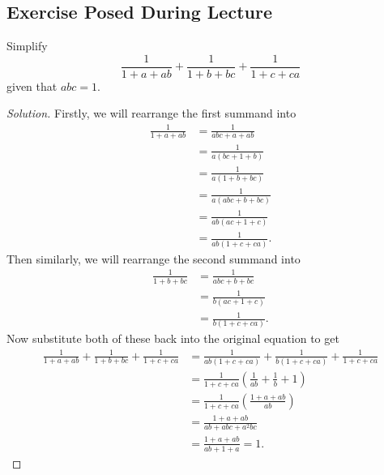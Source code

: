 \documentclass[11pt]{article}
\begin{document}
\subsection{Exercise Posed During Lecture}
Simplify
\[\frac{1}{1+a+ab} + \frac{1}{1+b+bc} + \frac{1}{1+c+ca}\]
given that $abc=1$.
\begin{proof}[Solution]
Firstly, we will rearrange the first summand into
	\begin{equation*}
		\begin{aligned}
			\frac{1}{1+a+ab} &= \frac{1}{abc + a + ab} \\
			                 &= \frac{1}{a(bc + 1 + b)} \\
					 &= \frac{1}{a(1 + b + bc)} \\
					 &= \frac{1}{a(abc + b + bc)} \\
					 &= \frac{1}{ab(ac + 1 + c)} \\
					 &= \frac{1}{ab(1 + c + ca)}.
		\end{aligned}
	\end{equation*}
Then similarly, we will rearrange the second summand into
	\begin{equation*}
		\begin{aligned}
			\frac{1}{1+b+bc} &= \frac{1}{abc + b + bc} \\
			                 &= \frac{1}{b(ac + 1 + c)} \\
					 &= \frac{1}{b(1 + c + ca)}.
		\end{aligned}
	\end{equation*}
Now substitute both of these back into the original equation to get
	\begin{equation*}
		\begin{aligned}
			\frac{1}{1+a+ab} + \frac{1}{1+b+bc} + \frac{1}{1+c+ca} &= \frac{1}{ab(1 + c + ca)} + \frac{1}{b(1 + c + ca)} + \frac{1}{1+c+ca} \\
									       &= \frac{1}{1+c+ca}\left(\frac{1}{ab} + \frac{1}{b} + 1\right) \\
									       &= \frac{1}{1+c+ca}\left(\frac{1+a+ab}{ab}\right) \\
									       &= \frac{1+a+ab}{ab+abc+a^2bc} \\
									       &= \frac{1+a+ab}{ab+1+a} = 1.
		\end{aligned}
	\end{equation*}
\end{proof}
\renewcommand\qedsymbol{$square$}
\end{document}
